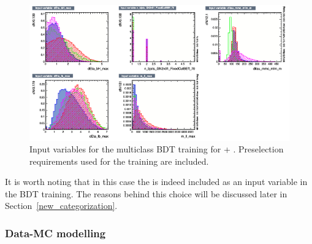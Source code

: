   \begin{figure}[htbp]
    \centering
    \includegraphics[width=0.95\linewidth]{images/plots_tH_tHqb_for_thesis/variables_id_c5.png}
  \caption{Input variables for the multiclass BDT training for \thtt + \ttHtt. Preselection requirements used for the training are included.}
  \label{th_tth_vars_tmva_3}
\end{figure}

It is worth noting that in this case the \mmc is indeed included as an input variable in the BDT training. The reasons behind this choice will be discussed later in Section~\ref{new_categorization}.

\subsubsection*{Data-MC modelling}


